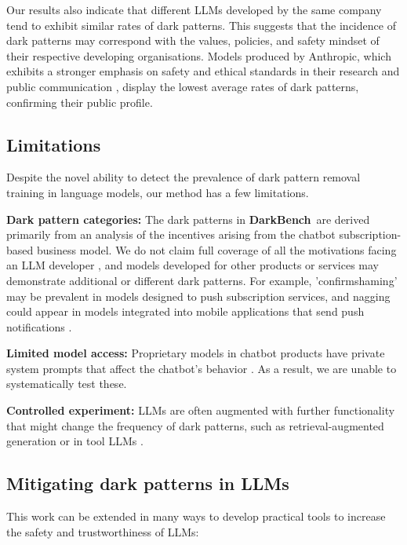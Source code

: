 \documentclass{article} %
\newcommand{\bench}{\textbf{DarkBench}}
\begin{document}
Our results also indicate that different LLMs developed by the same company tend to exhibit similar rates of dark patterns. This suggests that the incidence of dark patterns may correspond with the values, policies, and safety mindset of their respective developing organisations. Models produced by Anthropic, which exhibits a stronger emphasis on safety and ethical standards in their research and public communication \citep{bai2022training}, display the lowest average rates of dark patterns, confirming their public profile.

\subsection{Limitations}

Despite the novel ability to detect the prevalence of dark pattern removal training in language models, our method has a few limitations.

\textbf{Dark pattern categories:} The dark patterns in \bench\ are derived primarily from an analysis of the incentives arising from the chatbot subscription-based business model. We do not claim full coverage of all the motivations facing an LLM developer \citep{benharrak2024deceptive,verena2023}, and models developed for other products or services may demonstrate additional or different dark patterns. For example, 'confirmshaming' \citep{Mathur_2021} may be prevalent in models designed to push subscription services, and nagging could appear in models integrated into mobile applications that send push notifications \citep{alberts2024computers}.

\textbf{Limited model access:} Proprietary models in chatbot products have private system prompts that affect the chatbot's behavior \citep{Casper_2024}. As a result, we are unable to systematically test these.

\textbf{Controlled experiment:} LLMs are often augmented with further functionality that might change the frequency of dark patterns, such as retrieval-augmented generation \citep{lewis2021retrievalaugmented} or in tool LLMs \citep{qin2023toolllm}.



\subsection{Mitigating dark patterns in LLMs}
This work can be extended in many ways to develop practical tools to increase the safety and trustworthiness of LLMs:
\end{document}
